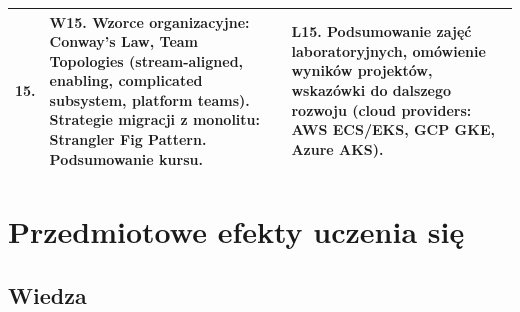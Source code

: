 \documentclass[12pt, a4paper]{article}
\begin{document}
{\begin{longtable}{m{1.5cm}m{6.5cm}m{6.5cm}}
  \rowcolor{tableRowLight} 15. & W15. Wzorce organizacyjne: Conway's Law, Team Topologies (stream-aligned, enabling, complicated subsystem, platform teams). Strategie migracji z monolitu: Strangler Fig Pattern. Podsumowanie kursu. & L15. Podsumowanie zajęć laboratoryjnych, omówienie wyników projektów, wskazówki do dalszego rozwoju (cloud providers: AWS ECS/EKS, GCP GKE, Azure AKS). \\
\bottomrule
\end{longtable}}

\section{Przedmiotowe efekty uczenia się}

\subsection*{Wiedza}
\end{document}
